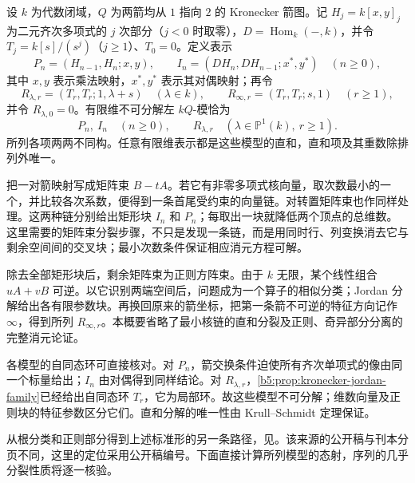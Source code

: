 \begin{theorem}\label{b5:thm:kronecker-normal-forms}
	设 \(k\) 为代数闭域，\(Q\) 为两箭均从 \(1\) 指向 \(2\) 的 Kronecker 箭图。记 \(H_j=k[x,y]_j\) 为二元齐次多项式的 \(j\) 次部分（\(j<0\) 时取零），\(D=\operatorname{Hom}_k(-,k)\)，并令 \(T_j=k[s]/(s^j)\)（\(j\ge1\)）、\(T_0=0\)。定义表示
	\[
		P_n=(H_{n-1},H_n;x,y),\qquad
		I_n=(DH_n,DH_{n-1};x^*,y^*)\quad(n\ge0),
	\]
	其中 \(x,y\) 表示乘法映射，\(x^*,y^*\) 表示其对偶映射；再令
	\[
		R_{\lambda,r}=(T_r,T_r;1,\lambda+s)\quad(\lambda\in k),\qquad
		R_{\infty,r}=(T_r,T_r;s,1)\quad(r\ge1),
	\]
	并令 \(R_{\lambda,0}=0\)。有限维不可分解左 \(kQ\)-模恰为
	\[
		P_n,\ I_n\quad(n\ge0),\qquad
		R_{\lambda,r}\quad(\lambda\in\mathbb P^1(k),\ r\ge1).
	\]
	所列各项两两不同构。任意有限维表示都是这些模型的直和，直和项及其重数除排列外唯一。
\end{theorem}
\begin{proofsketch}
	把一对箭映射写成矩阵束 \(B-tA\)。若它有非零多项式核向量，取次数最小的一个，并比较各次系数，便得到一条首尾受约束的向量链。对转置矩阵束也作同样处理。这两种链分别给出矩形块 \(I_n\) 和 \(P_n\)；每取出一块就降低两个顶点的总维数。这里需要的矩阵束分裂步骤，不只是发现一条链，而是用同时行、列变换消去它与剩余空间间的交叉块；最小次数条件保证相应消元方程可解。

	除去全部矩形块后，剩余矩阵束为正则方阵束。由于 \(k\) 无限，某个线性组合 \(uA+vB\) 可逆。以它识别两端空间后，问题成为一个算子的相似分类；Jordan 分解给出各有限参数块。再换回原来的箭坐标，把第一条箭不可逆的特征方向记作 \(\infty\)，得到所列 \(R_{\infty,r}\)。本概要省略了最小核链的直和分裂及正则、奇异部分分离的完整消元论证。

	各模型的自同态环可直接核对。对 \(P_n\)，箭交换条件迫使所有齐次单项式的像由同一个标量给出；\(I_n\) 由对偶得到同样结论。对 \(R_{\lambda,r}\)，\cref{b5:prop:kronecker-jordan-family}已经给出自同态环 \(T_r\)，它为局部环。故这些模型不可分解；维数向量及正则块的特征参数区分它们。直和分解的唯一性由 Krull--Schmidt 定理保证。
\end{proofsketch}
从根分类和正则部分得到上述标准形的另一条路径，见\cite[作者公开稿, Section 3.2, Theorem 3.10 and Example 3.11; Section 3.6, Proposition 3.32, Theorem 3.33 and Example 3.34]{Schiffmann2012HallAlgebras}。该来源的公开稿与刊本分页不同，这里的定位采用公开稿编号。下面直接计算所列模型的态射，序列的几乎分裂性质将逐一核验。

